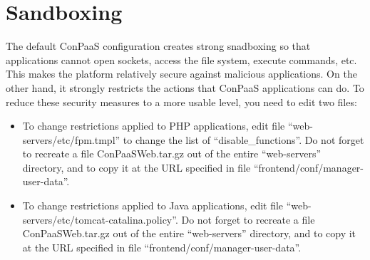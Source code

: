 \documentclass[12pt]{article}
\begin{document}
\section{Sandboxing}

The default ConPaaS configuration creates strong snadboxing so that
applications cannot open sockets, access the file system, execute
commands, etc. This makes the platform relatively secure against
malicious applications. On the other hand, it strongly restricts the
actions that ConPaaS applications can do. To reduce these security
measures to a more usable level, you need to edit two files:

\begin{itemize}
\item To change restrictions applied to PHP applications, edit file
  ``web-servers/etc/fpm.tmpl'' to change the list of
  ``disable\_functions''. Do not forget to recreate a file
  ConPaaSWeb.tar.gz out of the entire ``web-servers'' directory, and
  to copy it at the URL specified in file
  ``frontend/conf/manager-user-data''.
\item To change restrictions applied to Java applications, edit file
  ``web-servers/etc/tomcat-catalina.policy''. Do not forget to
  recreate a file ConPaaSWeb.tar.gz out of the entire ``web-servers''
  directory, and to copy it at the URL specified in file
  ``frontend/conf/manager-user-data''.
\end{itemize}
\end{document}
